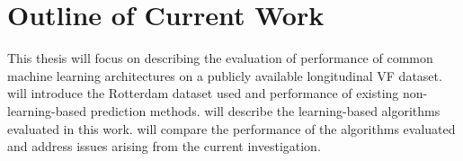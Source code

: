 
\section{Outline of Current Work}

This thesis will focus on describing the evaluation of performance of common machine learning architectures on a publicly available longitudinal \acl{VF} dataset.  will introduce the Rotterdam dataset used and performance of existing non-learning-based prediction methods.  will describe the learning-based algorithms evaluated in this work.  will compare the performance of the algorithms evaluated and address issues arising from the current investigation. 

